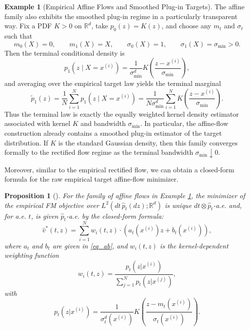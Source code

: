 \documentclass[a4paper,11pt]{article}
\newcommand{\R}{\mathbb{R}}
\theoremstyle{plain}
\newtheorem{propositioninner}[theoreminner]{Proposition}
\theoremstyle{definition}
\newtheorem{exampleinner}[theoreminner]{Example}
\newenvironment{proposition}[1][]
  {\begin{mdframed}[style=propositionstyle]\begin{propositioninner}[#1]}
  {\end{propositioninner}\end{mdframed}}
\newenvironment{example}[1][]
  {\begin{mdframed}[style=examplestyle]\begin{exampleinner}[#1]}
  {\end{exampleinner}\end{mdframed}}
\begin{document}
\begin{example}[Empirical Affine Flows and Smoothed Plug-in Targets]  \label{eg_empaffineflows}
The affine family also exhibits the smoothed plug-in regime in a particularly transparent way. Fix a  PDF $K > 0$ on $\R^d$, take $p_0(z)=K(z)$, and choose any $m_t$ and $\sigma_t$ such that
\[
m_0(X)=0, \qquad m_1(X)=X, \qquad \sigma_0(X)=1, \qquad \sigma_1(X)=\sigma_{\min}>0.
\]
Then the terminal conditional density is
\[
p_1(z\mid X=x^{(i)}) = \frac{1}{\sigma_{\min}^d}K\!\left(\frac{z-x^{(i)}}{\sigma_{\min}}\right),
\]
and averaging over the empirical target law yields the terminal marginal
\[
\tilde p_1(z)=\frac1N\sum_{i=1}^N p_1(z\mid X=x^{(i)})
=\frac{1}{N \sigma_{\min}^d} \sum_{i=1}^N K\!\left(\frac{z-x^{(i)}}{\sigma_{\min}}\right).
\]
Thus the terminal law is exactly the equally weighted kernel density estimator associated with kernel $K$ and bandwidth $\sigma_{\min}$. In particular, the affine-flow construction already contains a smoothed plug-in estimator of the target distribution. If $K$ is the standard Gaussian density, then this family converges formally to the rectified flow regime as the terminal bandwidth $\sigma_{\min} \downarrow 0$.
\end{example}


Moreover, similar to the empirical rectified flow, we can obtain a closed-form formula for the raw empirical target affine-flow minimizer.

\begin{proposition} \label{prop1} 
For the family of affine flows in Example \ref{eg_empaffineflows}, the minimizer of the empirical FM objective over
\(L^2(dt\,\hat p_t(dz);\mathbb R^d)\) is unique \(dt\otimes \hat p_t\)-a.e. and, for a.e. \(t\), is given \(\hat p_t\)-a.e. by the closed-form formula:
    \begin{equation}
        \hat{v}^*(t, z) = \sum_{i=1}^N w_i(t,z) \cdot (a_t(x^{(i)}) z + b_t(x^{(i)})),
    \end{equation}
where $a_t$ and $b_t$ are given in \eqref{eq_ab}, and $w_i(t,z)$ is the kernel-dependent weighting function
\begin{equation}
    w_i(t,z) = \frac{p_t(z|x^{(i)})}{\sum_{j=1}^N p_t(z|x^{(j)})},
\end{equation}
with 
\begin{equation}
    p_t(z|x^{(i)}) = \frac{1}{\sigma_t^d(x^{(i)})} K\left(\frac{z-m_t(x^{(i)})}{\sigma_t(x^{(i)})} \right).
\end{equation}
\end{proposition}
\end{document}
